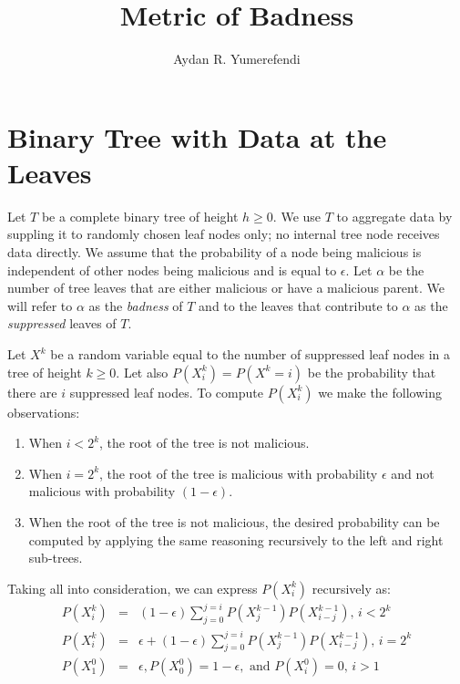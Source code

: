 \documentclass[10pt,twocolumn]{style}
\title{Metric of Badness}
\author{Aydan R. Yumerefendi}
\begin{document}
  \maketitle

  \section{Binary Tree with Data at the Leaves}
  \label{sec:leaves}
  
  Let $T$ be a complete binary tree of height $h \geq 0$. We use $T$
  to aggregate data by suppling it to randomly chosen leaf nodes
  only; no internal tree node receives data directly. We assume that
  the probability of a node being malicious is independent of other
  nodes being malicious and is equal to $\epsilon$. Let $\alpha$ be
  the number of tree leaves that are either malicious or have a
  malicious parent. We will refer to $\alpha$ as the \emph{badness} of $T$
  and to the leaves that contribute to $\alpha$ as the
  \emph{suppressed} leaves of $T$.

  Let $X^k$ be a random variable equal to the number of suppressed leaf
  nodes in a tree of height $k \geq 0$. Let also $P(X^k_i)=P(X^k=i)$
  be the probability that there are $i$ suppressed leaf nodes. To
  compute $P(X^k_i)$ we make the following observations:
  \begin{enumerate}
    \item When {\bf $i<2^k$}, the root of the tree is not malicious.
    \item When {\bf $i=2^k$}, the root of the tree is malicious with
  probability $\epsilon$ and not malicious with probability
  $(1-\epsilon)$.
    \item When the root of the tree is not malicious, the desired
    probability can be computed by applying the same reasoning
    recursively to the left and right sub-trees.
  \end{enumerate}
  Taking all into consideration, we can express $P(X^k_i)$
  recursively as:
  \begin{eqnarray}\label{eqn:notmalicious}
    P(X^k_i) &=& (1-\epsilon)\sum_{j=0}^{j=i}P(X^{k-1}_j)P(X^{k-1}_{i-j})
    \textrm{, $i<2^k$}\\
    P(X^k_i) &=& \epsilon + (1-\epsilon)\sum_{j=0}^{j=i}P(X^{k-1}_j)P(X^{k-1}_{i-j})
    \textrm{, $i=2^k$}\\
     P(X^0_1)&=&\epsilon,P(X^0_0)=1-\epsilon, \textrm{ and }P(X^0_i)=0
    \textrm{, $i>1$}
  \end{eqnarray}
\end{document}
